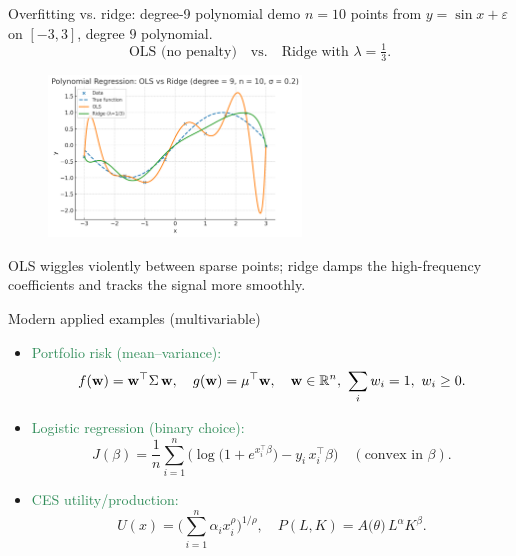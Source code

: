 \documentclass[11pt,aspectratio=169]{beamer}
\begin{document}
\begin{frame}{Overfitting vs. ridge: degree-9 polynomial demo}
\alert{$n=10$ points} from $y=\sin x+\varepsilon$ on $[-3,3]$, \alert{degree $9$} polynomial.
\[
\text{OLS (no penalty)} \quad \text{vs.}\quad \text{Ridge with }\lambda=\tfrac13.
\]
\begin{figure}
\centering
\includegraphics[width=0.6\textwidth]{img/ridge_overfitting.png}
\end{figure}
{\footnotesize OLS wiggles violently between sparse points; ridge damps the high-frequency coefficients and tracks the signal more smoothly.}
\end{frame}


\begin{frame}{Modern applied examples (multivariable)}

\begin{itemize}
\item \textcolor{SeaGreen}{Portfolio risk (mean--variance):}
\[
f({\bf w})={\bf w}^{\top}\Sigma\,{\bf w},\quad
g({\bf w})=\mu^{\top}{\bf w},\quad
{\bf w}\in\mathbb R^n,\ \sum_i w_i=1,\ w_i\ge 0.
\]
\item \textcolor{SeaGreen}{Logistic regression (binary choice):}
\[
J(\beta)=\frac{1}{n}\sum_{i=1}^n\!\Big(\log\big(1+e^{x_i^{\top}\beta}\big)-y_i\,x_i^{\top}\beta\Big)
\quad(\text{convex in }\beta).
\]
\item \textcolor{SeaGreen}{CES utility/production:}
\[
U(x)=\Big(\sum_{i=1}^n \alpha_i x_i^{\rho}\Big)^{\!1/\rho},\quad
P(L,K)=A\big(\theta\big)\,L^{\alpha}K^{\beta}.
\]
\end{itemize}

\end{frame}
\end{document}
